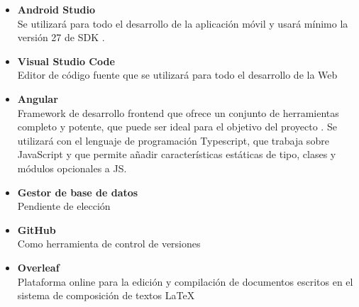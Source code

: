\documentclass[12pt,oneside,a4paper]{article}
\begin{document}
\begin{itemize}
    \begin{itemize}
        \item \textbf{Android Studio} \\
        Se utilizará para todo el desarrollo de la aplicación móvil y usará mínimo la versión 27 de SDK  \cite{hohensee2014introduccion}. \\
        \item \textbf{Visual Studio Code} \\
        Editor de código fuente que se utilizará para todo el desarrollo de la Web \\
        \item \textbf{Angular} \\
        Framework de desarrollo frontend que ofrece un conjunto de herramientas completo y potente, que puede ser ideal para el objetivo del proyecto \cite{wilken2018angular}. Se utilizará con el lenguaje de programación Typescript, que trabaja sobre JavaScript y que permite añadir características estáticas de tipo, clases y módulos opcionales a JS. \\
        \item \textbf{Gestor de base de datos} \\
Pendiente de elección \\
        \item \textbf{GitHub} \\
        Como herramienta de control de versiones \\
        \item \textbf{Overleaf} \\
        Plataforma online para la edición y compilación de documentos escritos en el sistema de composición de textos \LaTeX \cite{wikibook}\\
    \end{itemize}
    
\end{itemize}













\end{document}
